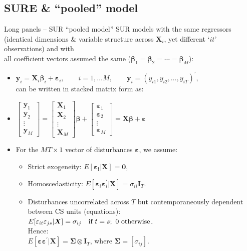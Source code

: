 \documentclass[usenames,dvipsnames]{beamer}
\begin{document}
\subsection*{SURE \& ``pooled'' model}
\begin{frame}{Long panels -- SUR ``pooled model''}
\small
SUR models with the same regressors (identical dimensions \& variable structure across $\bm{X}_i$, yet different `$it$' observations) and with \\
all coefficient vectors assumed the same ($\bm{\beta}_1=\bm{\beta}_2=\cdots=\bm{\beta}_M$):\\
\begin{itemize}
    \item $\bm{y}_i = \bm{X}_i \bm{\beta}_i + \bm{\varepsilon}_i,\qquad i = 1,\dots M,\qquad \bm{y}_i = (y_{i1},y_{i2},\dots,y_{iT})^{\prime}, $\\ \smallskip 
    can be written in stacked matrix form as:
    \medskip
    \item $\begin{bmatrix}
    \bm{y}_1 \\ \bm{y}_2 \\ \vdots \\ \bm{y}_M
    \end{bmatrix} = 
    \begin{bmatrix} 
    \bm{X}_1 \\ \bm{X}_2 \\ \vdots \\ \bm{X}_M 
    \end{bmatrix} \bm{\beta} + 
    \begin{bmatrix}
    \bm{\varepsilon}_1 \\ \bm{\varepsilon}_2 \\ \vdots \\ \bm{\varepsilon}_M
    \end{bmatrix} = \bm{X\beta}+\bm{\varepsilon}$
    \medskip
    \item For the $MT \times 1$ vector of disturbances $\bm{\varepsilon}$, we assume:
    \begin{itemize}
        \item Strict exogeneity: $E[\bm{\varepsilon_i}|\bm{X}]=\bm{0}$,
        \item Homoscedasticity: $E[\bm{\varepsilon}_i \bm{\varepsilon}_i^{\prime} |\bm{X}]=\sigma_{ii}\bm{I}_T$.
        \item Disturbances uncorrelated across $T$ but contemporaneously dependent between CS units (equations):\\
        $E[\varepsilon_{it} \varepsilon_{js} |\bm{X}]=\sigma_{ij}~~~\textnormal{if}~t=s;~0~\textnormal{otherwise}$.\\ Hence:\\
        $E[\bm{\varepsilon} \bm{\varepsilon}^{\prime} |\bm{X}] = \bm{\Sigma} \otimes \bm{I}_T$, \quad where $\bm{\Sigma} = [\sigma_{ij}]$.
    \end{itemize}
\end{itemize}
\end{frame}
\end{document}
